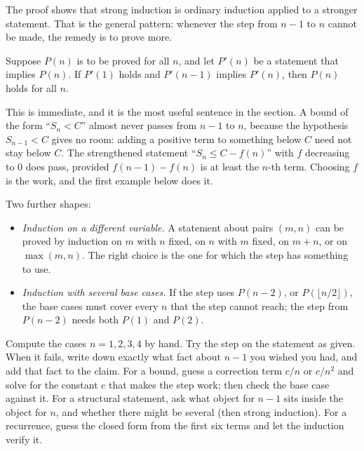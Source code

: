 The proof shows that strong induction is ordinary induction applied to a stronger statement. That is the general pattern: whenever the step from $n-1$ to $n$ cannot be made, the remedy is to prove more.

\begin{proposition}[Strengthening]
Suppose $P(n)$ is to be proved for all $n$, and let $P'(n)$ be a statement that implies $P(n)$. If $P'(1)$ holds and $P'(n-1)$ implies $P'(n)$, then $P(n)$ holds for all $n$.
\end{proposition}

This is immediate, and it is the most useful sentence in the section. A bound of the form ``$S_n < C$'' almost never passes from $n-1$ to $n$, because the hypothesis $S_{n-1} < C$ gives no room: adding a positive term to something below $C$ need not stay below $C$. The strengthened statement ``$S_n \le C - f(n)$'' with $f$ decreasing to $0$ does pass, provided $f(n-1) - f(n)$ is at least the $n$-th term. Choosing $f$ is the work, and the first example below does it.

Two further shapes:

\begin{itemize}[nosep,leftmargin=*]
\item \emph{Induction on a different variable.} A statement about pairs $(m, n)$ can be proved by induction on $m$ with $n$ fixed, on $n$ with $m$ fixed, on $m + n$, or on $\max(m, n)$. The right choice is the one for which the step has something to use.
\item \emph{Induction with several base cases.} If the step uses $P(n-2)$, or $P(\lfloor n/2 \rfloor)$, the base cases must cover every $n$ that the step cannot reach; the step from $P(n-2)$ needs both $P(1)$ and $P(2)$.
\end{itemize}

\begin{firstmoves}
Compute the cases $n = 1, 2, 3, 4$ by hand. Try the step on the statement as given. When it fails, write down exactly what fact about $n - 1$ you wished you had, and add that fact to the claim. For a bound, guess a correction term $c/n$ or $c/n^2$ and solve for the constant $c$ that makes the step work; then check the base case against it. For a structural statement, ask what object for $n - 1$ sits inside the object for $n$, and whether there might be several (then strong induction). For a recurrence, guess the closed form from the first six terms and let the induction verify it.
\end{firstmoves}

